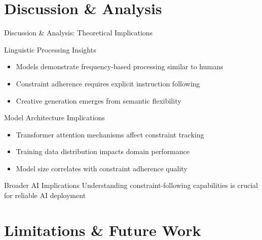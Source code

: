 \documentclass[aspectratio=169]{beamer}
\begin{document}
\section{Discussion \& Analysis}

\begin{frame}{Discussion \& Analysis: Theoretical Implications}
\begin{block}{Linguistic Processing Insights}
\begin{itemize}
    \item Models demonstrate frequency-based processing similar to humans
    \item Constraint adherence requires explicit instruction following
    \item Creative generation emerges from semantic flexibility
\end{itemize}
\end{block}

\begin{block}{Model Architecture Implications}
\begin{itemize}
    \item Transformer attention mechanisms affect constraint tracking
    \item Training data distribution impacts domain performance
    \item Model size correlates with constraint adherence quality
\end{itemize}
\end{block}

\begin{alertblock}{Broader AI Implications}
Understanding constraint-following capabilities is crucial for reliable AI deployment
\end{alertblock}
\end{frame}

\section{Limitations \& Future Work}
\end{document}
